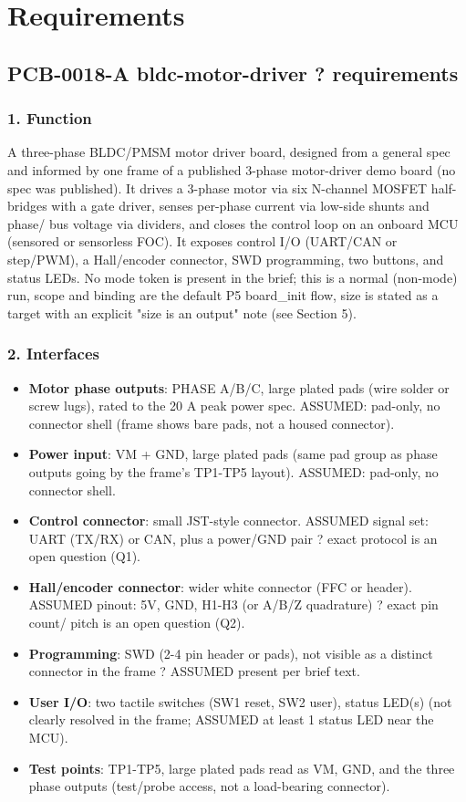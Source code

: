 \documentclass[11pt,a4paper]{article}
\begin{document}
\section{Requirements}
\subsection*{PCB-0018-A bldc-motor-driver ? requirements}
\subsubsection*{1. Function}
A three-phase BLDC/PMSM motor driver board, designed from a general spec and informed by one frame of a published 3-phase motor-driver demo board (no spec was published). It drives a 3-phase motor via six N-channel MOSFET half-bridges with a gate driver, senses per-phase current via low-side shunts and phase/ bus voltage via dividers, and closes the control loop on an onboard MCU (sensored or sensorless FOC). It exposes control I/O (UART/CAN or step/PWM), a Hall/encoder connector, SWD programming, two buttons, and status LEDs. No mode token is present in the brief; this is a normal (non-mode) run, scope and binding are the default P5 board\_init flow, size is stated as a target with an explicit "size is an output" note (see Section 5).

\subsubsection*{2. Interfaces}
\begin{itemize}
\item \textbf{Motor phase outputs}: PHASE A/B/C, large plated pads (wire solder or
screw lugs), rated to the 20 A peak power spec. ASSUMED: pad-only, no
connector shell (frame shows bare pads, not a housed connector).
\item \textbf{Power input}: VM + GND, large plated pads (same pad group as phase
outputs going by the frame's TP1-TP5 layout). ASSUMED: pad-only, no
connector shell.
\item \textbf{Control connector}: small JST-style connector. ASSUMED signal set:
UART (TX/RX) or CAN, plus a power/GND pair ? exact protocol is an open
question (Q1).
\item \textbf{Hall/encoder connector}: wider white connector (FFC or header).
ASSUMED pinout: 5V, GND, H1-H3 (or A/B/Z quadrature) ? exact pin count/
pitch is an open question (Q2).
\item \textbf{Programming}: SWD (2-4 pin header or pads), not visible as a distinct
connector in the frame ? ASSUMED present per brief text.
\item \textbf{User I/O}: two tactile switches (SW1 reset, SW2 user), status LED(s)
(not clearly resolved in the frame; ASSUMED at least 1 status LED near
the MCU).
\item \textbf{Test points}: TP1-TP5, large plated pads read as VM, GND, and the
three phase outputs (test/probe access, not a load-bearing connector).
\end{itemize}
\end{document}
